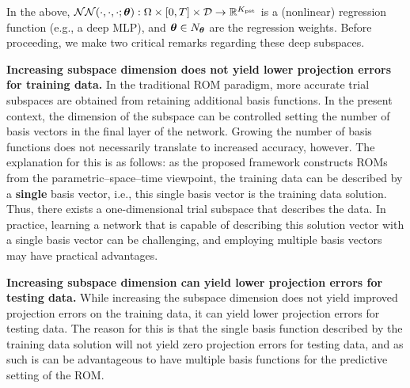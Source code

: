 \documentclass[3p,computermodern,10pt]{elsarticle}
\begin{document}
In the above, $\mathcal{NN}(\cdot,\cdot,\cdot;\boldsymbol \theta): \Omega \times [0,T] \times \mathcal{D} \rightarrow \mathbb{R}^{K_{\text{pst}}}$ is a (nonlinear) regression function (e.g., a deep MLP), and $\boldsymbol \theta \in  N_{\boldsymbol \theta}$ are the regression weights. Before proceeding, we make two critical remarks regarding these deep subspaces. 

\begin{remark}               
\textbf{Increasing subspace dimension does not yield lower projection errors for training data.} In the traditional ROM paradigm, more accurate trial subspaces are obtained from retaining additional basis functions. In the present context, the dimension of the subspace can be controlled setting the number of basis vectors in the final layer of the network. Growing the number of basis functions does not necessarily translate to increased accuracy, however. The explanation for this is as follows: as the proposed framework constructs ROMs from the parametric--space--time viewpoint, the training data can be described by a \textbf{single} basis vector, i.e., this single basis vector is the training data solution. Thus, there exists a one-dimensional trial subspace that describes the data. In practice, learning a network that is capable of describing this solution vector with a single basis vector can be challenging, and employing multiple basis vectors may have practical advantages.  
\end{remark}
\begin{remark}               
\textbf{Increasing subspace dimension can yield lower projection errors for testing data.} While increasing the subspace dimension does not yield improved projection errors on the training data, it can yield lower projection errors for testing data. The reason for this is that the single basis function described by the training data solution will not yield zero projection errors for testing data, and as such is can be advantageous to have multiple basis functions for the predictive setting of the ROM. 
\end{remark}
\end{document}
